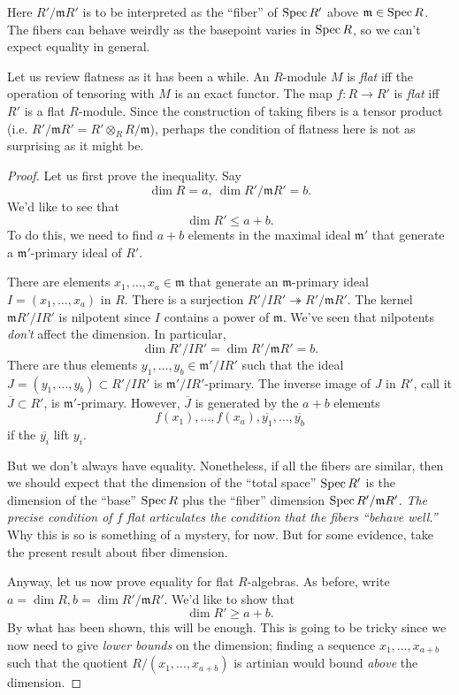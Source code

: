 Here $R'/\mathfrak{m}R'$ is to be interpreted as the ``fiber'' of $\operatorname{Spec} R'$
above $\mathfrak{m} \in \operatorname{Spec} R$. The fibers can behave weirdly as the
basepoint varies in $\operatorname{Spec} R$, so we can't
expect equality in general.

\begin{remark} 
Let us review flatness as it has been a while. An $R$-module $M$ is \emph{flat} iff
the operation of tensoring with $M$ is an exact functor. The map $f: R \to R'$
is \emph{flat} iff $R'$ is a flat $R$-module. Since the construction of taking
fibers is a tensor product (i.e. $R'/\mathfrak{m}R' = R' \otimes_R
R/\mathfrak{m}$), perhaps the condition of flatness here is not as surprising as
it might be.
\end{remark} 

\begin{proof} 
Let us first prove the inequality. Say $$\dim R = a,  \ \dim R'/\mathfrak{m}R'
= b.$$ We'd like to see that
\[ \dim R' \leq a+b.  \]
To do this, we need to find $a+b$ elements in the maximal ideal $\mathfrak{m}'$
that generate a $\mathfrak{m}'$-primary ideal of $R'$. 

There are elements $x_1, \dots, x_a \in \mathfrak{m}$ that generate an
$\mathfrak{m}$-primary ideal $I = (x_1, \dots, x_a)$ in $R$. There is a surjection $R'/I R'
\twoheadrightarrow R'/\mathfrak{m}R'$.
The kernel $\mathfrak{m}R'/IR'$ is nilpotent since $I$ contains a power of
$\mathfrak{m}$. 	We've seen that nilpotents \emph{don't} affect the dimension.
In particular, 
\[ \dim R'/IR' = \dim R'/\mathfrak{m}R' = b.  \]
There are thus elements $y_1, \dots, y_b \in \mathfrak{m}'/IR'$ such that the
ideal $J = (y_1, \dots, y_b) \subset R'/I R'$ is $\mathfrak{m}'/IR'$-primary.
The inverse image of $J$ in $R'$, call it $\overline{J} \subset R'$, is
$\mathfrak{m}'$-primary. However, $\overline{J}$ is generated by the $a+b$
elements
\[ f(x_1), \dots, f(x_a), \overline{y_1}, \dots, \overline{y_b}  \]
if the $\overline{y_i}$ lift $y_i$. 

But we don't always have equality. Nonetheless, if all the fibers are similar,
then we should expect that the dimension of the ``total space'' $\operatorname{Spec} R'$ is
the dimension of the ``base'' $\operatorname{Spec} R$ plus the ``fiber'' dimension $\operatorname{Spec}
R'/\mathfrak{m}R'$.  
\emph{The precise condition of $f$ flat articulates the condition that the fibers
 ``behave well.'' }
Why this is so is something of a mystery, for now.
But for some evidence, take the present result about fiber dimension.

Anyway, let us now prove equality for flat $R$-algebras. As before, write $a =
\dim R, b = \dim R'/\mathfrak{m}R'$. We'd like to show that
\[ \dim R' \geq a+b.  \]
By what has been shown, this will be enough.
This is going to be tricky since we now need to give \emph{lower bounds} on the
dimension; finding a sequence $x_{1}, \dots, x_{a+b}$ such that the quotient
$R/(x_1, \dots, x_{a+b})$ is artinian would bound \emph{above} the dimension.


\end{proof}
